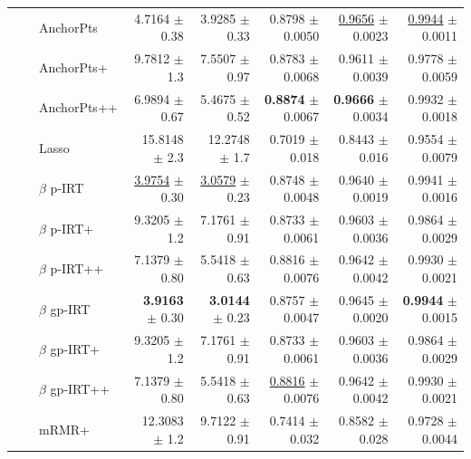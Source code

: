 \begin{longtable}{llp{}rrrrr}
 &  & AnchorPts & 4.7164 {\scriptsize $\pm$ 0.38} & 3.9285 {\scriptsize $\pm$ 0.33} & 0.8798 {\scriptsize $\pm$ 0.0050} & \underline{0.9656} {\scriptsize $\pm$ 0.0023} & \underline{0.9944} {\scriptsize $\pm$ 0.0011} \\
 &  & AnchorPts+ & 9.7812 {\scriptsize $\pm$ 1.3} & 7.5507 {\scriptsize $\pm$ 0.97} & 0.8783 {\scriptsize $\pm$ 0.0068} & 0.9611 {\scriptsize $\pm$ 0.0039} & 0.9778 {\scriptsize $\pm$ 0.0059} \\
 &  & AnchorPts++ & 6.9894 {\scriptsize $\pm$ 0.67} & 5.4675 {\scriptsize $\pm$ 0.52} & \textbf{0.8874} {\scriptsize $\pm$ 0.0067} & \textbf{0.9666} {\scriptsize $\pm$ 0.0034} & 0.9932 {\scriptsize $\pm$ 0.0018} \\
 &  & Lasso & 15.8148 {\scriptsize $\pm$ 2.3} & 12.2748 {\scriptsize $\pm$ 1.7} & 0.7019 {\scriptsize $\pm$ 0.018} & 0.8443 {\scriptsize $\pm$ 0.016} & 0.9554 {\scriptsize $\pm$ 0.0079} \\
 &  & $\beta$ p-IRT & \underline{3.9754} {\scriptsize $\pm$ 0.30} & \underline{3.0579} {\scriptsize $\pm$ 0.23} & 0.8748 {\scriptsize $\pm$ 0.0048} & 0.9640 {\scriptsize $\pm$ 0.0019} & 0.9941 {\scriptsize $\pm$ 0.0016} \\
 &  & $\beta$ p-IRT+ & 9.3205 {\scriptsize $\pm$ 1.2} & 7.1761 {\scriptsize $\pm$ 0.91} & 0.8733 {\scriptsize $\pm$ 0.0061} & 0.9603 {\scriptsize $\pm$ 0.0036} & 0.9864 {\scriptsize $\pm$ 0.0029} \\
 &  & $\beta$ p-IRT++ & 7.1379 {\scriptsize $\pm$ 0.80} & 5.5418 {\scriptsize $\pm$ 0.63} & 0.8816 {\scriptsize $\pm$ 0.0076} & 0.9642 {\scriptsize $\pm$ 0.0042} & 0.9930 {\scriptsize $\pm$ 0.0021} \\
 &  & $\beta$ gp-IRT & \textbf{3.9163} {\scriptsize $\pm$ 0.30} & \textbf{3.0144} {\scriptsize $\pm$ 0.23} & 0.8757 {\scriptsize $\pm$ 0.0047} & 0.9645 {\scriptsize $\pm$ 0.0020} & \textbf{0.9944} {\scriptsize $\pm$ 0.0015} \\
 &  & $\beta$ gp-IRT+ & 9.3205 {\scriptsize $\pm$ 1.2} & 7.1761 {\scriptsize $\pm$ 0.91} & 0.8733 {\scriptsize $\pm$ 0.0061} & 0.9603 {\scriptsize $\pm$ 0.0036} & 0.9864 {\scriptsize $\pm$ 0.0029} \\
 &  & $\beta$ gp-IRT++ & 7.1379 {\scriptsize $\pm$ 0.80} & 5.5418 {\scriptsize $\pm$ 0.63} & \underline{0.8816} {\scriptsize $\pm$ 0.0076} & 0.9642 {\scriptsize $\pm$ 0.0042} & 0.9930 {\scriptsize $\pm$ 0.0021} \\
 &  & mRMR+ & 12.3083 {\scriptsize $\pm$ 1.2} & 9.7122 {\scriptsize $\pm$ 0.91} & 0.7414 {\scriptsize $\pm$ 0.032} & 0.8582 {\scriptsize $\pm$ 0.028} & 0.9728 {\scriptsize $\pm$ 0.0044} \\

\end{longtable}
